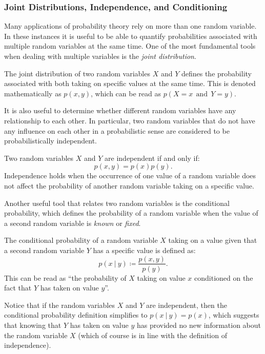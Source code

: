 \subsubsection{Joint Distributions, Independence, and Conditioning}
Many applications of probability theory rely on more than one random variable. In these instances it is useful to be able to quantify probabilities associated with multiple random variables at the same time. One of the most fundamental tools when dealing with multiple variables is the \textit{joint distribution}.
\begin{definition}
The joint distribution of two random variables $X$ and $Y$ defines the probability associated with both taking on specific values at the same time. This is denoted mathematically as $p(x,y)$, which can be read as $p(X=x \:\:\text{and}\:\: Y=y)$.
\end{definition}
It is also useful to determine whether different random variables have any relationship to each other. In particular, two random variables that do not have any influence on each other in a probabilistic sense are considered to be probabilistically independent.
\begin{definition}[Independence]
Two random variables $X$ and $Y$ are independent if and only if:
\begin{equation} \label{eq:indep}
    p(x,y)=p(x)p(y).
\end{equation}
Independence holds when the occurrence of one value of a random variable does not affect the probability of another random variable taking on a specific value.
\end{definition}
Another useful tool that relates two random variables is the conditional probability, which defines the probability of a random variable when the value of a second random variable is \textit{known} or \textit{fixed}.
\begin{definition}
The conditional probability of a random variable $X$ taking on a value given that a second random variable $Y$ has a specific value is defined as:
\begin{equation} \label{eq:condprob}
    p(x\:|\: y)\coloneqq \frac{p(x,y)}{p(y)}.
\end{equation}
This can be read as ``the probability of $X$ taking on value $x$ conditioned on the fact that $Y$ has taken on value $y$''.
\end{definition}
Notice that if the random variables $X$ and $Y$ are independent, then the conditional probability definition simplifies to $p(x\:|\: y) = p(x)$, which suggests that knowing that $Y$ has taken on value $y$ has provided no new information about the random variable $X$ (which of course is in line with the definition of independence).
